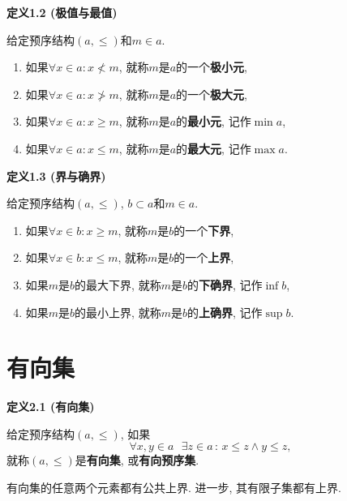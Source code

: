 \documentclass[UTF8]{ctexart}
\begin{document}
\vspace{10pt}

\hypertarget{sec:定义1.2}{}
\noindent\textbf{定义1.2 (极值与最值)}

给定预序结构$(a,\leqslant)$和$m\in a$.
\begin{enumerate}
    \item 如果$\forall x\in a:x\nless m$, 就称$m$是$a$的一个\textbf{极小元},
    \item 如果$\forall x\in a:x\ngtr m$, 就称$m$是$a$的一个\textbf{极大元},
    \item 如果$\forall x\in a:x\geqslant m$, 就称$m$是$a$的\textbf{最小元},
    记作$\min a$,
    \item 如果$\forall x\in a:x\leqslant m$, 就称$m$是$a$的\textbf{最大元},
    记作$\max a$.
\end{enumerate}

\vspace{10pt}

\hypertarget{sec:定义1.3}{}
\noindent\textbf{定义1.3 (界与确界)}

给定预序结构$(a,\leqslant)$, $b\subset a$和$m\in a$.
\begin{enumerate}
    \item 如果$\forall x\in b:x\geqslant m$, 就称$m$是$b$的一个\textbf{下界},
    \item 如果$\forall x\in b:x\leqslant m$, 就称$m$是$b$的一个\textbf{上界},
    \item 如果$m$是$b$的最大下界, 就称$m$是$b$的\textbf{下确界}, 记作$\inf b$,
    \item 如果$m$是$b$的最小上界, 就称$m$是$b$的\textbf{上确界}, 记作$\sup b$.
\end{enumerate}





\newpage

\section{有向集}

\hypertarget{sec:定义2.1}{}
\noindent\textbf{定义2.1 (有向集)}

给定预序结构$(a,\leqslant)$, 如果
\[
    \forall x,y\in a\,\,\,\,\exists z\in a\,:\,x\leqslant z\land y\leqslant z,
\]
就称$(a,\leqslant)$是\textbf{有向集}, 或\textbf{有向预序集}.

\vspace{10pt}

有向集的任意两个元素都有公共上界. 进一步, 其有限子集都有上界.
\end{document}
